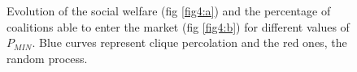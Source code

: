 \documentclass[conference]{IEEEtran}
\begin{document}
\begin{figure}
 \centering
  \hspace{1em}%
\caption{Evolution of the social welfare (fig \ref{fig4:a}) and the percentage of coalitions able to enter the market (fig \ref{fig4:b}) for different values of $ P_{MIN} $. Blue curves represent clique percolation and the red ones, the random process.}
\label{Fig4}
\end{figure}

%
%

\end{document}
